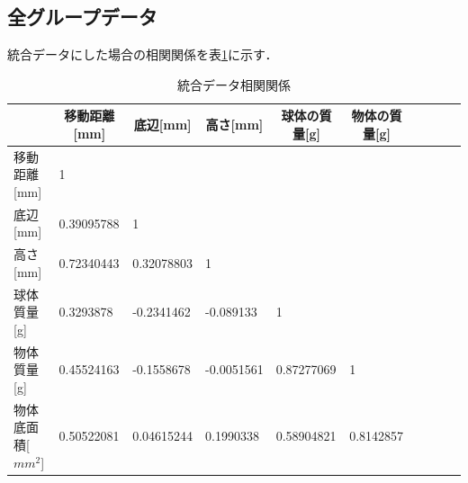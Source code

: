 \documentclass[titlepage,a4paper]{jsarticle}
\begin{document}
\subsection{全グループデータ}\label{全グループデータ}
統合データにした場合の相関関係を表\ref{統合相関関係}に示す．
\begin{table}[H]
  \centering
  \caption{統合データ相関関係}
  \label{統合相関関係}
  \begin{tabular}{l|lllllllll}
    \multicolumn{1}{c}{} & \multicolumn{1}{c}{移動距離{[}mm{]}} & \multicolumn{1}{c}{底辺{[}mm{]}} & \multicolumn{1}{c}{高さ{[}mm{]}} & \multicolumn{1}{c}{球体の質量{[}g{]}} & \multicolumn{1}{c}{物体の質量{[}g{]}} \\\hline\hline
    移動距離{[}mm{]}         & 1                                &                                &                                &                                  &                                  \\
    底辺{[}mm{]}           & 0.39095788                       & 1                              &                                &                                  &                                  \\
    高さ{[}mm{]}           & 0.72340443                       & 0.32078803                     & 1                              &                                  &                                  \\
    球体質量{[}g{]}          & 0.3293878                        & -0.2341462                     & -0.089133                      & 1                                &                                  \\
    物体質量{[}g{]}          & 0.45524163                       & -0.1558678                     & -0.0051561                     & 0.87277069                       & 1                                \\
    物体底面積{[}$mm^{2}${]}  & 0.50522081                       & 0.04615244                     & 0.1990338                      & 0.58904821                       & 0.8142857                        \\\hline
  \end{tabular}
\end{table}
\end{document}
